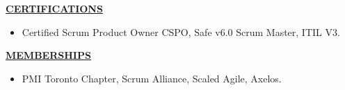 \documentclass{article}
\begin{document}
\vspace{2mm}
\noindent \textbf{\underline{CERTIFICATIONS}}
\begin{itemize}[noitemsep,nolistsep,leftmargin=*]
    \item Certified Scrum Product Owner CSPO, Safe v6.0 Scrum Master, ITIL V3.
\end{itemize}

\vspace{2mm}
\noindent \textbf{ \underline {MEMBERSHIPS}}
\begin{itemize}[noitemsep,nolistsep,leftmargin=*]
    \item PMI Toronto Chapter, Scrum Alliance, Scaled Agile, Axelos.
\end{itemize}
\end{document}
